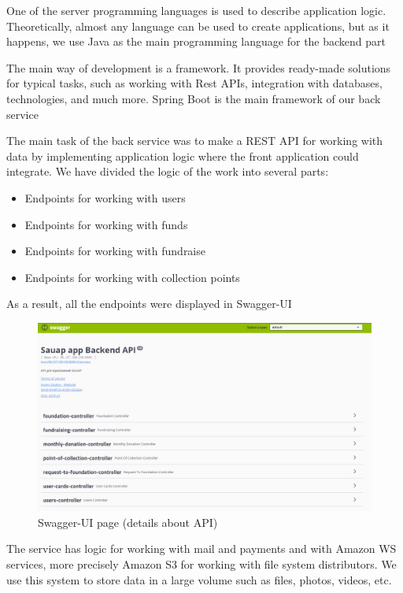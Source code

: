     One of the server programming languages is used to describe application logic. Theoretically, almost any language \cite{golang} can be used to create applications, but as it happens, we use Java as the main programming language for the backend part
    
    The main way of development is a framework. It provides ready-made solutions for typical tasks, such as working with Rest APIs, integration with databases, technologies, and much more. Spring Boot is the main framework of our back service
    
    The main task of the back service was to make a REST API for working with data by implementing application logic where the front application could integrate. We have divided the logic of the work into several parts:
    \begin{itemize}
        \item Endpoints for working with users 
        \item Endpoints for working with funds
        \item Endpoints for working with fundraise
        \item Endpoints for working with collection points
    \end{itemize}
    
    As a result, all the endpoints were displayed in Swagger-UI
    
    \begin{figure}[h]
        \centering
        \includegraphics[width=13cm]{figures/swagger.png}
        \caption{Swagger-UI page (details about API)}
        \label{fig:13}
    \end{figure}
    
    The service has logic for working with mail and payments and with Amazon WS services, more precisely Amazon S3 for working with file system distributors. We use this system to store data in a large volume such as files, photos, videos, etc. 
    
